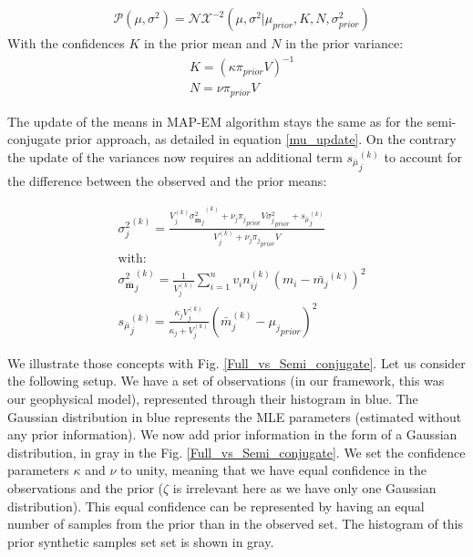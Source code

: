 \documentclass[extra]{gji} %
\begin{document}
\begin{align}
&\mathcal{P}({\mu},\sigma^2) = \mathcal{N}\mathcal{X}^{-2}({\mu}, \sigma^2|{\mu}_{prior}, K, N,\sigma_{prior}^2) \label{mu_sigma_prior}
\end{align}
With the confidences $K$ in the prior mean and $N$ in the prior variance:
\begin{align}
&{K}=({\kappa}{\pi}_{prior}V)^{-1}\\
&{N}={\nu}{\pi}_{prior}V
\end{align}

The update of the means in MAP-EM algorithm stays the same as for the semi-conjugate prior approach, as detailed in equation \ref{mu_update}. On the contrary the update of the variances now requires an additional term ${s_{\bar{{\mu}}}}_j^{(k)}$ to account for the difference between the observed and the prior means:

\begin{align}
&{\sigma_j^2}^{(k)} = \frac{{{V_{j}^{(k)}} {\sigma^2_{\bar{\mathbf{m}}}}_j}^{(k)} + \nu_j {\pi_j}_{prior} V {\sigma_j^2}_{prior}+ {s_{\bar{{\mu}}}}_j^{(k)} }
{{V_{j}^{(k)}} + \nu_j {\pi_j}_{prior} V} \label{sig_update_full}\\
&\text{with:} \nonumber\\
&{\sigma^2_{\bar{\mathbf{m}}}}_j^{(k)} =\frac{1}{{V_{j}^{(k)}}} \sum_{i=1}^{n} v_i n_{ij}^{(k)}({m}_i-\bar{{m}_j}^{(k)})^2\\
&{s_{\bar{{\mu}}}}_j^{(k)} = \frac{\kappa_j V_{j}^{(k)} }{\kappa_j + V_{j}^{(k)}}(\bar{{m}}_j^{(k)}-{{\mu}_{j}}_{prior})^2 \label{full_additionalterm}
\end{align}

We illustrate those concepts with Fig. \ref{Full_vs_Semi_conjugate}. Let us consider the following setup. We have a set of observations (in our framework, this was our geophysical model), represented through their histogram in blue. The Gaussian distribution in blue represents the MLE parameters (estimated without any prior information). We now add prior information in the form of a Gaussian distribution, in gray in the Fig. \ref{Full_vs_Semi_conjugate}. We set the confidence parameters $\kappa$ and $\nu$ to unity, meaning that we have equal confidence in the observations and the prior ($\zeta$ is irrelevant here as we have only one Gaussian distribution). This equal confidence can be represented by having an equal number of samples from the prior than in the observed set. The histogram of this prior synthetic samples set set is shown in gray.
\end{document}
